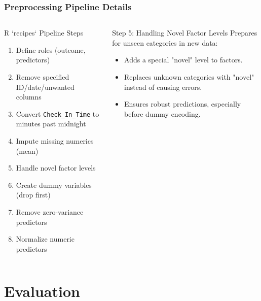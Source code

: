 \documentclass{beamer}
\begin{document}
\begin{frame}
\frametitle{Preprocessing Pipeline Details}
    \begin{columns}[T] %
        \begin{block}{R `recipes` Pipeline Steps}
        \small %
        \begin{enumerate}
            \item Define roles (outcome, predictors)
            \item Remove specified ID/date/unwanted columns
            \item Convert \texttt{Check\_In\_Time} to minutes past midnight
            \item Impute missing numerics (mean)
            \item Handle novel factor levels
            \item Create dummy variables (drop first)
            \item Remove zero-variance predictors
            \item Normalize numeric predictors
        \end{enumerate}
        \end{block}
        
        \begin{alertblock}{Step 5: Handling Novel Factor Levels}
        \footnotesize %
        Prepares for unseen categories in new data:
            \begin{itemize}
                \item Adds a special "novel" level to factors.
                \item Replaces unknown categories with "novel" instead of causing errors.
                \item Ensures robust predictions, especially before dummy encoding.
            \end{itemize}
        \end{alertblock}

    \end{columns}
\end{frame}

\section{Evaluation}
\end{document}
